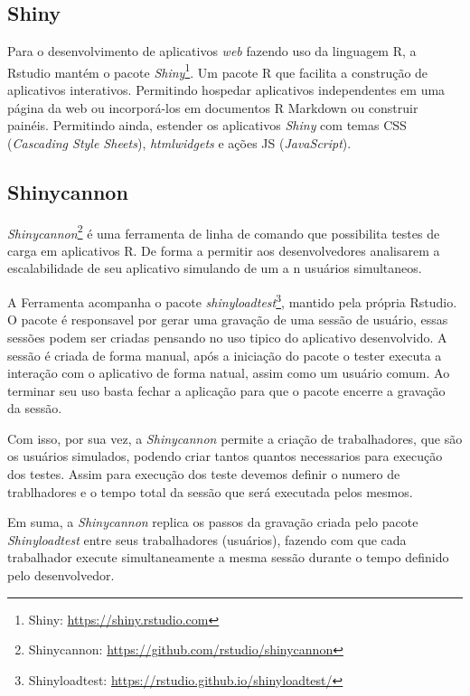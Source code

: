 \documentclass[12pt,english,brazil]{article}
\begin{document}
\subsection{Shiny} \label{sec:Shiny}

Para o desenvolvimento de aplicativos \emph{web} fazendo uso da linguagem R, a Rstudio mantém o pacote \emph{Shiny}\footnote{Shiny: \url{https://shiny.rstudio.com}}. Um pacote R que facilita a construção de aplicativos interativos. Permitindo hospedar aplicativos independentes em uma página da web ou incorporá-los em documentos R Markdown ou construir painéis. Permitindo ainda, estender os aplicativos \emph{Shiny} com temas CSS (\emph{Cascading Style Sheets}), \emph{htmlwidgets} e ações JS (\emph{JavaScript}).

\subsection{Shinycannon} \label{sec:Shinycannon}

\textit{Shinycannon}\footnote{Shinycannon: \url{https://github.com/rstudio/shinycannon}} é uma ferramenta de linha de comando que possibilita testes de carga em aplicativos R. De forma a permitir aos desenvolvedores analisarem a escalabilidade de seu aplicativo simulando de um a n usuários simultaneos.

A Ferramenta acompanha o pacote \textit{shinyloadtest}\footnote{Shinyloadtest: \url{https://rstudio.github.io/shinyloadtest/}}, mantido pela própria Rstudio. O pacote é responsavel por gerar uma gravação de uma sessão de usuário, essas sessões podem ser criadas pensando no uso tipico do aplicativo desenvolvido\cite{shinyloadtest}. A sessão é criada de forma manual, após a iniciação do pacote o tester executa a interação com o aplicativo de forma natual, assim como um usuário comum. Ao terminar seu uso basta fechar a aplicação para que o pacote encerre a gravação da sessão.

Com isso, por sua vez, a \textit{Shinycannon} permite a criação de trabalhadores, que são os usuários simulados, podendo criar tantos quantos necessarios para execução dos testes. Assim para execução dos teste devemos definir o numero de trablhadores e o tempo total da sessão que será executada pelos mesmos. 

Em suma, a \textit{Shinycannon} replica os passos da gravação criada pelo pacote \textit{Shinyloadtest} entre seus trabalhadores (usuários), fazendo com que cada trabalhador execute simultaneamente a mesma sessão durante o tempo definido pelo desenvolvedor.
\end{document}
